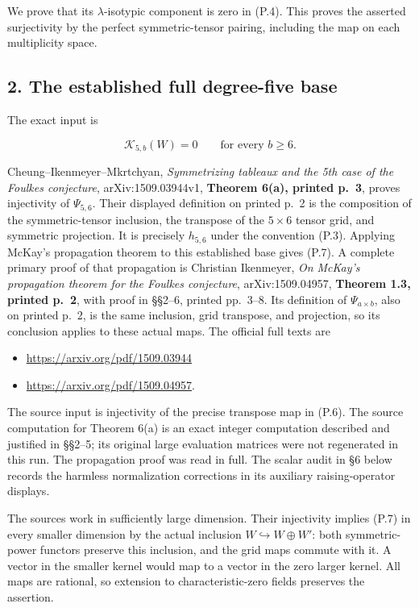\documentclass[
  10pt,
]{article}
\providecommand{\tightlist}{%
  \setlength{\itemsep}{0pt}\setlength{\parskip}{0pt}}
\providecommand{\tightlist}{\setlength{\itemsep}{0pt}\setlength{\parskip}{0pt}}
\begin{document}
We prove that its \(\lambda\)-isotypic component is zero in (P.4). This
proves the asserted surjectivity by the perfect symmetric-tensor
pairing, including the map on each multiplicity space.

\subsection{2. The established full degree-five
base}\label{the-established-full-degree-five-base}

The exact input is

\[
\mathcal K_{5,b}(W)=0\qquad\text{for every }b\ge6.
\tag{P.7}
\]

Cheung--Ikenmeyer--Mkrtchyan, \emph{Symmetrizing tableaux and the 5th
case of the Foulkes conjecture}, arXiv:1509.03944v1, \textbf{Theorem
6(a), printed p.~3}, proves injectivity of \(\Psi_{5,6}\). Their
displayed definition on printed p.~2 is the composition of the
symmetric-tensor inclusion, the transpose of the \(5\times6\) tensor
grid, and symmetric projection. It is precisely \(h_{5,6}\) under the
convention (P.3). Applying McKay's propagation theorem to this
established base gives (P.7). A complete primary proof of that
propagation is Christian Ikenmeyer, \emph{On McKay's propagation theorem
for the Foulkes conjecture}, arXiv:1509.04957, \textbf{Theorem 1.3,
printed p.~2}, with proof in §§2--6, printed pp.~3--8. Its definition of
\(\Psi_{a\times b}\), also on printed p.~2, is the same inclusion, grid
transpose, and projection, so its conclusion applies to these actual
maps. The official full texts are

\begin{itemize}
\tightlist
\item
  \url{https://arxiv.org/pdf/1509.03944}
\item
  \url{https://arxiv.org/pdf/1509.04957}.
\end{itemize}

The source input is injectivity of the precise transpose map in (P.6).
The source computation for Theorem 6(a) is an exact integer computation
described and justified in §§2--5; its original large evaluation
matrices were not regenerated in this run. The propagation proof was
read in full. The scalar audit in §6 below records the harmless
normalization corrections in its auxiliary raising-operator displays.

The sources work in sufficiently large dimension. Their injectivity
implies (P.7) in every smaller dimension by the actual inclusion
\(W\hookrightarrow W\oplus W'\): both symmetric-power functors preserve
this inclusion, and the grid maps commute with it. A vector in the
smaller kernel would map to a vector in the zero larger kernel. All maps
are rational, so extension to characteristic-zero fields preserves the
assertion.
\end{document}

